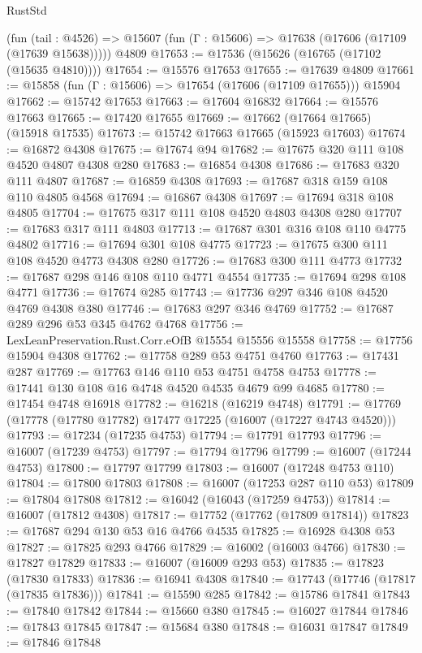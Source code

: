 \begin{lexlean}{RustStd}
\begin{coremodule}
    (fun (tail : @4526) => @15607 (fun (Γ : @15606) => @17638 (@17606 (@17109 (@17639 @15638)))))
    @4809
@17653 := @17536 (@15626 (@16765 (@17102 (@15635 @4810))))
@17654 := @15576 @17653
@17655 := @17639 @4809
@17661 := @15858 (fun (Γ : @15606) => @17654 (@17606 (@17109 @17655))) @15904
@17662 := @15742 @17653
@17663 := @17604 @16832
@17664 := @15576 @17663
@17665 := @17420 @17655
@17669 := @17662 (@17664 @17665) (@15918 @17535)
@17673 := @15742 @17663 @17665 (@15923 @17603)
@17674 := @16872 @4308
@17675 := @17674 @94
@17682 := @17675 @320 @111 @108 @4520 @4807 @4308 @280
@17683 := @16854 @4308
@17686 := @17683 @320 @111 @4807
@17687 := @16859 @4308
@17693 := @17687 @318 @159 @108 @110 @4805 @4568
@17694 := @16867 @4308
@17697 := @17694 @318 @108 @4805
@17704 := @17675 @317 @111 @108 @4520 @4803 @4308 @280
@17707 := @17683 @317 @111 @4803
@17713 := @17687 @301 @316 @108 @110 @4775 @4802
@17716 := @17694 @301 @108 @4775
@17723 := @17675 @300 @111 @108 @4520 @4773 @4308 @280
@17726 := @17683 @300 @111 @4773
@17732 := @17687 @298 @146 @108 @110 @4771 @4554
@17735 := @17694 @298 @108 @4771
@17736 := @17674 @285
@17743 := @17736 @297 @346 @108 @4520 @4769 @4308 @380
@17746 := @17683 @297 @346 @4769
@17752 := @17687 @289 @296 @53 @345 @4762 @4768
@17756 := LexLeanPreservation.Rust.Corr.eOfB @15554 @15556 @15558
@17758 := @17756 @15904 @4308
@17762 := @17758 @289 @53 @4751 @4760
@17763 := @17431 @287
@17769 := @17763 @146 @110 @53 @4751 @4758 @4753
@17778 := @17441 @130 @108 @16 @4748 @4520 @4535 @4679 @99 @4685
@17780 := @17454 @4748 @16918
@17782 := @16218 (@16219 @4748)
@17791 := @17769 (@17778 (@17780 @17782) @17477 @17225 (@16007 (@17227 @4743 @4520)))
@17793 := @17234 (@17235 @4753)
@17794 := @17791 @17793
@17796 := @16007 (@17239 @4753)
@17797 := @17794 @17796
@17799 := @16007 (@17244 @4753)
@17800 := @17797 @17799
@17803 := @16007 (@17248 @4753 @110)
@17804 := @17800 @17803
@17808 := @16007 (@17253 @287 @110 @53)
@17809 := @17804 @17808
@17812 := @16042 (@16043 (@17259 @4753))
@17814 := @16007 (@17812 @4308)
@17817 := @17752 (@17762 (@17809 @17814))
@17823 := @17687 @294 @130 @53 @16 @4766 @4535
@17825 := @16928 @4308 @53
@17827 := @17825 @293 @4766
@17829 := @16002 (@16003 @4766)
@17830 := @17827 @17829
@17833 := @16007 (@16009 @293 @53)
@17835 := @17823 (@17830 @17833)
@17836 := @16941 @4308
@17840 := @17743 (@17746 (@17817 (@17835 @17836)))
@17841 := @15590 @285
@17842 := @15786 @17841
@17843 := @17840 @17842
@17844 := @15660 @380
@17845 := @16027 @17844
@17846 := @17843 @17845
@17847 := @15684 @380
@17848 := @16031 @17847
@17849 := @17846 @17848

\end{coremodule}
\end{lexlean}
